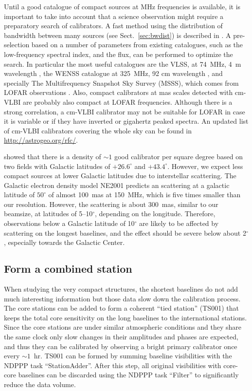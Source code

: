\documentclass[graybox]{svmult}
\begin{document}
Until a good catalogue of compact sources at MHz frequencies is available, it is
important to take into account that a science observation might require a
preparatory search of calibrators. A fast method using the distribution of
bandwidth between many sources (see Sect.~\ref{sec:bwdist}) is described in
\cite{moldon15}. A pre-selection based on a number of parameters from existing
catalogues, such as the low-frequency spectral index, and the flux, can be
performed to optimize the search. In particular the most useful catalogues are
the VLSS, at 74~MHz, 4~m wavelength \citep{lane12a}, the WENSS catalogue at
325~MHz, 92 cm wavelength \citep{rengelink97}, and specially The Multifrequency
Snapshot Sky Survey (MSSS), which comes from LOFAR observations \citep{heald14}.
Also, compact calibrators at mas scales detected with cm-VLBI are probably also
compact at LOFAR frequencies. Although there is a strong correlation, a cm-VLBI
calibrator may not be suitable for LOFAR in case it is variable or if they have
inverted or gigahertz peaked spectra. An updated list of cm-VLBI calibrators
covering the whole sky can be found in \url{http://astrogeo.org/rfc/}.

\cite{moldon15} showed that there is a density of $\sim1$ good calibrator per
square degree based on two fields with Galactic latitudes of $+26.6^{\circ}$ and
$+43.4^{\circ} $. However, we expect less compact sources at lower Galactic
latitudes due to interstellar scattering. The Galactic electron density model
NE2001 \citep{cordes02} predicts an scattering at a galactic latitude of
$50^{\circ}$ of almost 100~mas at 150~MHz, which is five times smaller than our
resolution. However, the scattering is about 300~mas, similar to our beamsize,
at latitudes of 5--10$^{\circ}$, depending on the longitude. Therefore,
observations below a Galactic latitude of 10$^{\circ}$ are likely to be affected
by scattering on the longest baselines, and the effect should be severe below
about 2$^{\circ}$, especially towards the Galactic Center. 

\subsection{Form a combined station}
\label{sect:ts001}
When studying the very compact structures, the shortest baselines do not add
much interesting information but those data slow down the calibration process.
The core stations can be added to form a coherent ``tied station'' (TS001) that
keeps the total core sensitivity on the long baselines to the international
stations.  Since the core stations are under similar atmospheric conditions and
they share the same clock only slow changes in their amplitudes and phases are
expected, and thus they can be calibrated by observing a bright primary
calibrator once every $\sim1$~hr. TS001 can be formed by summing baseline
visibilities with the NDPPP task ``StationAdder''.  After this step, all
original visibilities with core-core baselines can be discarded using the NDPPP
task ``Filter'' to significantly reduce the data volume.
\end{document}
